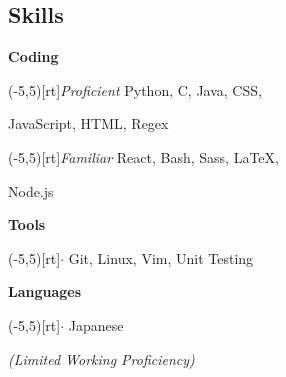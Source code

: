 \documentclass[9pt]{extarticle}
\newcommand{\info}[1]{\color{info}\textit{#1}}
\newcommand{\sidebox}[1]{\makebox(-5,5)[rt]{#1}}
\newcommand{\sidenote}[1]{\scriptsize\info{#1}}
\newcommand{\Subsection}[2]{
    {\normalsize\color{subsection}\textbf{#1}}
    \begin{trivlist}
        \color{bullet}
        #2
    \end{trivlist}
}
\newcommand{\ChronoItem}[2]{
    \item
    \sidebox{\sidenote{#2}}%
    \color{bullet}#1
}
\newcommand{\InfoItem}[1]{
    \item
    \info{(#1)}
}
\newcommand{\Bullet}{
    \item
    \sidebox{\color{info}$\cdot$}%
    \color{bullet}
}
\newcommand{\vsubspace}{\vspace{1.5em}}
\begin{document}
\begin{paracol}{2}
\begin{rightcolumn}
        \section{Skills}
            \Subsection{Coding}{
                \ChronoItem{Python, C, Java, CSS,}{Proficient}
                \item JavaScript, HTML, Regex
                \ChronoItem{React, Bash, Sass, LaTeX,}{Familiar}
                \item Node.js
            }
            \vsubspace
            \Subsection{Tools}{
                \Bullet Git, Linux, Vim, Unit Testing
            }
            \vsubspace
            \Subsection{Languages}{
                \Bullet Japanese
                \InfoItem{Limited Working Proficiency}
            }
    \end{rightcolumn}
\end{paracol}
\end{document}
